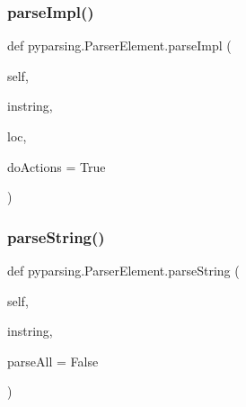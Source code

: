\subsubsection{\texorpdfstring{parse\+Impl()}{parseImpl()}}
{\footnotesize\ttfamily def pyparsing.\+Parser\+Element.\+parse\+Impl (\begin{DoxyParamCaption}\item[{}]{self,  }\item[{}]{instring,  }\item[{}]{loc,  }\item[{}]{do\+Actions = {\ttfamily True} }\end{DoxyParamCaption})}

\mbox{\label{classpyparsing_1_1ParserElement_a0026d86408e4fb2faa89c985dcb89738}} 
\subsubsection{\texorpdfstring{parse\+String()}{parseString()}}
{\footnotesize\ttfamily def pyparsing.\+Parser\+Element.\+parse\+String (\begin{DoxyParamCaption}\item[{}]{self,  }\item[{}]{instring,  }\item[{}]{parse\+All = {\ttfamily False} }\end{DoxyParamCaption})}

